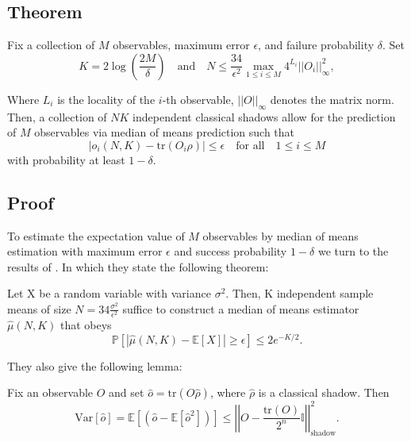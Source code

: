 \documentclass[12pt]{article}
\begin{document}
    \subsection{Theorem}
    Fix a collection of $M$ observables, maximum error $\epsilon$, and failure probability $\delta$. Set 
    \begin{equation*}
        K = 2 \log{\left(\frac{2M}{\delta}\right)} \quad \text{and} \quad N \leq \frac{34}{\epsilon^2} \max_{1 \leq i \leq M} 4^{L_i} ||O_i||^2_\infty,
    \end{equation*}

    Where $L_i$ is the locality of the $i$-th observable, $||O||_\infty$ denotes the matrix norm. Then, a collection of $NK$ independent classical shadows allow for the prediction of $M$ observables via median of means prediction such that
    \begin{equation*}
        |\hat{o}_i(N,K) - \text{tr}(O_i\rho)| \leq \epsilon \quad \text{for all} \quad 1 \leq i \leq M
    \end{equation*}
    with probability at least $1-\delta$.

    \subsection{Proof}
    To estimate the expectation value of $M$ observables by median of means estimation with maximum error $\epsilon$ and success probability $1-\delta$ we turn to the results of \cite{Huang_Kueng_Preskill_2020}. In which they state the following theorem:
    \begin{theorem}
        Let X be a random variable with variance $\sigma^2$. Then, K independent sample means of size $N = 34 \frac{\sigma^2}{\epsilon^2}$ suffice to construct a median of means estimator $\hat{\mu}(N, K)$ that obeys 
        \begin{equation}
            \mathbb{P}[|\hat{\mu}(N, K) - \mathbb{E}[X]| \geq \epsilon] \leq 2e^{-K/2}.
        \end{equation}
    \end{theorem}

    They also give the following lemma:
    \begin{lemma}
        Fix an observable $O$ and set $\hat{o} = \text{tr}(O\hat{\rho})$, where $\hat{\rho}$ is a classical shadow. Then
        \begin{equation}
            \text{Var}[\hat{o}] = \mathbb{E}\left[(\hat{o}-\mathbb{E}[\hat{o}^2])\right] \leq \left|\left| O - \frac{\text{tr}(O)}{2^n} \mathbb{I} \right|\right|^2_\text{shadow}.
        \end{equation}
    \end{lemma}
\end{document}
